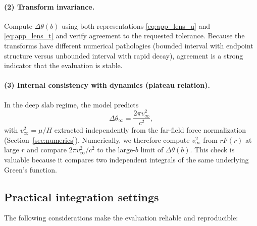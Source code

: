 \documentclass[11pt]{article}
\begin{document}
\paragraph{(2) Transform invariance.}
Compute $\Delta\theta(b)$ using both representations \eqref{eq:app_lens_u} and \eqref{eq:app_lens_t}
and verify agreement to the requested tolerance.  Because the transforms have different numerical
pathologies (bounded interval with endpoint structure versus unbounded interval with rapid decay),
agreement is a strong indicator that the evaluation is stable.

\paragraph{(3) Internal consistency with dynamics (plateau relation).}
In the deep slab regime, the model predicts
\begin{equation}
  \Delta\theta_\infty = \frac{2\pi v_\infty^2}{c^2},
\end{equation}
with $v_\infty^2=\mu/H$ extracted independently from the far-field force normalization (Section~\ref{sec:numerics}).
Numerically, we therefore compute $v_\infty^2$ from $rF(r)$ at large $r$ and compare
$2\pi v_\infty^2/c^2$ to the large-$b$ limit of $\Delta\theta(b)$.  This check is valuable because it
compares two independent integrals of the same underlying Green's function.

\subsection{Practical integration settings}

The following considerations make the evaluation reliable and reproducible:
\end{document}
